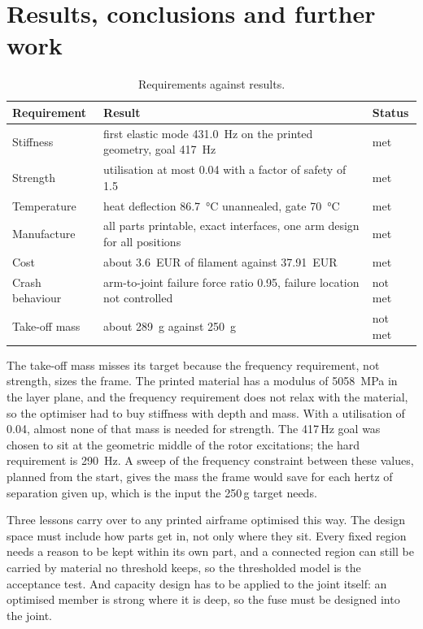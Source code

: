 \section{Results, conclusions and further work}\label{sec:results}

\begin{table}[htbp]
\centering\small
\caption{Requirements against results.}\label{tab:results}
\begin{tabularx}{\linewidth}{@{}lXl@{}}
\toprule
Requirement & Result & Status\\
\midrule
Stiffness & first elastic mode \SI{431.0}{Hz} on the printed geometry, goal \SI{417}{Hz} & met\\
Strength & utilisation at most 0.04 with a factor of safety of 1.5 & met\\
Temperature & heat deflection \SI{86.7}{\celsius} unannealed, gate \SI{70}{\celsius} & met\\
Manufacture & all parts printable, exact interfaces, one arm design for all positions & met\\
Cost & about \SI{3.6}{EUR} of filament against \SI{37.91}{EUR} & met\\
Crash behaviour & arm-to-joint failure force ratio 0.95, failure location not controlled & not met\\
Take-off mass & about \SI{289}{g} against \SI{250}{g} & not met\\
\bottomrule
\end{tabularx}
\end{table}

The take-off mass misses its target because the frequency requirement, not strength, sizes the frame. The printed material has a modulus of \SI{5058}{MPa} in the layer plane, and the frequency requirement does not relax with the material, so the optimiser had to buy stiffness with depth and mass. With a utilisation of 0.04, almost none of that mass is needed for strength. The 417\,Hz goal was chosen to sit at the geometric middle of the rotor excitations; the hard requirement is \SI{290}{Hz}. A sweep of the frequency constraint between these values, planned from the start, gives the mass the frame would save for each hertz of separation given up, which is the input the 250\,g target needs.

Three lessons carry over to any printed airframe optimised this way. The design space must include how parts get in, not only where they sit. Every fixed region needs a reason to be kept within its own part, and a connected region can still be carried by material no threshold keeps, so the thresholded model is the acceptance test. And capacity design has to be applied to the joint itself: an optimised member is strong where it is deep, so the fuse must be designed into the joint.

